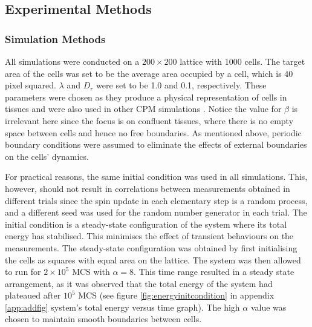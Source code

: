 \documentclass[a4paper,12pt]{article}
\begin{document}
\subsection{Experimental Methods}
\subsubsection{Simulation Methods}
All simulations were conducted on a $200 \times 200$ lattice with 1000 cells. The target area of the cells was set to be the average area occupied by a cell, which is 40 pixel squared. $\lambda$ and $D_r$ were set to be 1.0 and 0.1, respectively. These parameters were chosen as they produce a physical representation of cells in tissues and were also used in other CPM simulations \cite{szabo2010,graner1992}. Notice the value for $\beta$ is irrelevant here since the focus is on confluent tissues, where there is no empty space between cells and hence no free boundaries. As mentioned above, periodic boundary conditions were assumed to eliminate the effects of external boundaries on the cells' dynamics. 

For practical reasons, the same initial condition was used in all simulations. This, however, should not result in correlations between measurements obtained in different trials since the spin update in each elementary step is a random process, and a different seed was used for the random number generator in each trial. The initial condition is a steady-state configuration of the system where its total energy has stabilised. This minimises the effect of transient behaviours on the measurements. The steady-state configuration was obtained by first initialising the cells as squares with equal area on the lattice. The system was then allowed to run for $2 \times 10^5$ MCS with $\alpha = 8$. This time range resulted in a steady state arrangement, as it was observed that the total energy of the system had plateaued after $10^5$ MCS (see figure \ref{fig:energyinitcondition} in appendix \ref{app:addfig} system's total energy versus time graph). The high $\alpha$ value was chosen to maintain smooth boundaries between cells.
\end{document}
